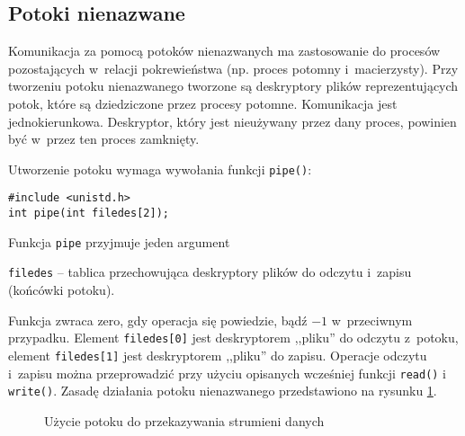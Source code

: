 \subsection{Potoki nienazwane}
\label{sec:NAMCF}

Komunikacja za pomocą potoków nienazwanych ma zastosowanie do procesów
pozostających w~relacji pokrewieństwa (np. proces potomny i~macierzysty). Przy
tworzeniu potoku nienazwanego tworzone są deskryptory plików reprezentujących
potok, które są dziedziczone przez procesy potomne. Komunikacja jest
jednokierunkowa. Deskryptor, który jest nieużywany przez dany proces, powinien
być w~przez ten proces zamknięty.

Utworzenie potoku wymaga wywołania funkcji \texttt{pipe()}:
\begin{lstlisting}[style=MyCStyle]
#include <unistd.h>
int pipe(int filedes[2]);
\end{lstlisting}
Funkcja \texttt{pipe} przyjmuje jeden argument
\begin{myitemize}
  \item \texttt{filedes} -- tablica przechowująca deskryptory plików do odczytu
        i~zapisu (końcówki potoku).
\end{myitemize}
Funkcja zwraca zero, gdy operacja się powiedzie, bądź $-1$ w~przeciwnym
przypadku. Element \texttt{filedes[0]} jest deskryptorem ,,pliku'' do odczytu
z~potoku, element \texttt{filedes[1]} jest deskryptorem ,,pliku'' do zapisu.
Operacje odczytu i~zapisu można przeprowadzić przy użyciu opisanych wcześniej
funkcji \texttt{read()} i \texttt{write()}. Zasadę działania potoku
nienazwanego przedstawiono na rysunku \ref{fig:OF6P4}.
\begin{figure}[!h]
  \centering
  \caption{Użycie potoku do przekazywania strumieni danych}
  \label{fig:OF6P4}
\end{figure}

